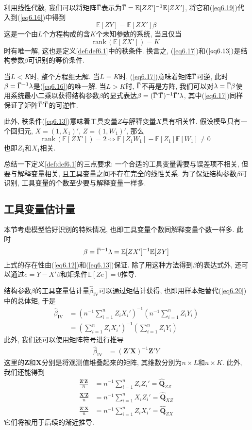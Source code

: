 \documentclass[cn, 12pt, math=mtpro2, bibstyle=apa, blue, twocol]{elegantbook}
\newcommand{\E}{\mathbb{E}}
\newcommand{\Q}{\mathbold{Q}}
\newcommand{\X}{\mathbold{X}}
\newcommand{\Z}{\mathbold{Z}}
\newcommand{\hb}{\hat{\beta}}
\newcommand{\overbar}[1]{\mkern 1.5mu\overline{\mkern-1.5mu#1\mkern-1.5mu}\mkern 1.5mu}
\begin{document}
利用线性代数, 我们可以将矩阵$\overbar{\Gamma}$表示为$\overbar{\Gamma}=\E[ZZ']^{-1}\E[ZX']$, 将它和(\ref{eq6.19})代入到(\ref{eq6.16})中得到
$$\E[ZY]=\E[ZX']\beta$$
这是一个由$L$个方程构成的含$K$个未知参数的系统, 当且仅当
$$\text{rank}\,(\E[ZX'])=K$$
时有唯一解, 这也是定义\ref{def:def6.1}中的秩条件. 换言之, (\ref{eq6.17})和$(\ref{eq6.13})$是结构参数$\beta$可识别的等价条件.

当$L<K$时, 整个方程组无解. 当$L=K$时, (\ref{eq6.17})意味着矩阵$\overbar{\Gamma}$可逆, 此时$\beta=\overbar{\Gamma}^{-1}\lambda$是(\ref{eq6.16})的唯一解. 当$L>K$时, $\overbar{\Gamma}$不再是方阵, 我们可以对$\lambda=\overbar{\Gamma}\beta$使用系统最小二乘以获得结构参数$\beta$的显式表达$\beta=(\overbar{\Gamma}'\overbar{\Gamma})^{-1}\overbar{\Gamma}'\lambda$, 其中(\ref{eq6.17})同样保证了矩阵$\overbar{\Gamma}'\overbar{\Gamma}$的可逆性.

此外, 秩条件(\ref{eq6.13})意味着工具变量$Z$与解释变量$X$具有相关性. 假设模型只有一个回归元, $X=(1,X_1)'$, $Z=(1,W_1)'$, 那么
$$\text{rank}\,(\E[ZX'])=2\Leftrightarrow \E[Z_1W_1]-\E[Z_1]\E[W_1]\neq0$$
也即$Z_1$和$X_1$相关.

总结一下定义\ref{def:def6.1}的三点要求: 一个合适的工具变量需要与误差项不相关, 但要与解释变量相关, 且工具变量之间不存在完全的线性关系. 为了保证结构参数$\beta$可识别, 工具变量的个数至少要与解释变量一样多.
\subsection{工具变量估计量}
本节考虑模型恰好识别的特殊情况, 也即工具变量个数同解释变量个数一样多. 此时
\begin{equation}\label{eq6.20}
  \beta=\overbar{\Gamma}^{-1}\lambda=\E[ZX']^{-1}\E[ZY]
\end{equation}
上式的存在性由(\ref{eq6.12})和(\ref{eq6.13})保证. 除了用这种方法得到$\beta$的表达式外, 还可以通过$e=Y-X'\beta$和矩条件$\E[Ze]=0$推导.

结构参数$\beta$的工具变量估计量$\hb_{\text{IV}}$可以通过矩估计获得, 也即用样本矩替代(\ref{eq6.20})中的总体矩, 于是
\begin{align*}
\hb_{\text{IV}}&=\left(n^{-1}\sum_{i=1}^{n}Z_iX_i'\right)^{-1}\left(n^{-1}\sum_{i=1}^{n}Z_iY_i\right) \\
&=\left(\sum_{i=1}^{n}Z_iX_i'\right)^{-1}\left(\sum_{i=1}^{n}Z_iY_i\right)
\end{align*}
此外, 我们还可以使用矩阵符号进行推导
\begin{align*}
\hat{\beta}_{\text{IV}}&=(\Z'\X)^{-1}\Z'Y
\end{align*}
这里的$\Z$和$\X$分别是将观测值堆叠起来的矩阵, 其维数分别为$n\times L$和$n\times K$. 此外, 我们还能得到
\begin{align*}
\frac{\Z'\Z}{n}&=n^{-1}\sum_{i=1}^{n}Z_iZ_i'=\hat{\Q}_{ZZ} \\
\frac{\X'\Z}{n}&=n^{-1}\sum_{i=1}^{n}X_iZ_i'=\hat{\Q}_{XZ}\\
\frac{\Z'\X}{n}&=n^{-1}\sum_{i=1}^{n}Z_iX_i'=\hat{\Q}_{ZX}
\end{align*}
它们将被用于后续的渐近推导.
\end{document}
